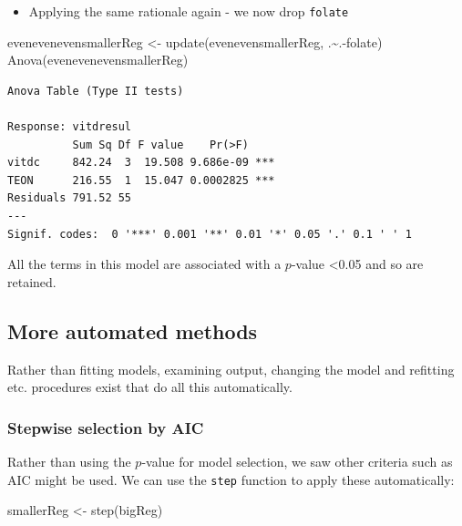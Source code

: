 \documentclass[
  oneside]{krantz}
\newenvironment{Shaded}{\begin{snugshade}}{\end{snugshade}}
\newcommand{\FunctionTok}[1]{\textcolor[rgb]{0.00,0.00,0.00}{#1}}
\newcommand{\NormalTok}[1]{#1}
\newcommand{\OtherTok}[1]{\textcolor[rgb]{0.56,0.35,0.01}{#1}}
\newcommand{\SpecialCharTok}[1]{\textcolor[rgb]{0.00,0.00,0.00}{#1}}
\providecommand{\tightlist}{%
  \setlength{\itemsep}{0pt}\setlength{\parskip}{0pt}}
\begin{document}
\begin{itemize}
\tightlist
\item
  Applying the same rationale again - we now drop \texttt{folate}
\end{itemize}

\begin{Shaded}
\begin{Highlighting}[]
\NormalTok{evenevenevensmallerReg }\OtherTok{\textless{}{-}} \FunctionTok{update}\NormalTok{(evenevensmallerReg, .}\SpecialCharTok{\textasciitilde{}}\NormalTok{.}\SpecialCharTok{{-}}\NormalTok{folate)}
\FunctionTok{Anova}\NormalTok{(evenevenevensmallerReg)}
\end{Highlighting}
\end{Shaded}

\begin{verbatim}
Anova Table (Type II tests)

Response: vitdresul
          Sum Sq Df F value    Pr(>F)    
vitdc     842.24  3  19.508 9.686e-09 ***
TEON      216.55  1  15.047 0.0002825 ***
Residuals 791.52 55                      
---
Signif. codes:  0 '***' 0.001 '**' 0.01 '*' 0.05 '.' 0.1 ' ' 1
\end{verbatim}

All the terms in this model are associated with a \(p\)-value \textless0.05 and so are retained.

\hypertarget{more-automated-methods}{%
\subsection{More automated methods}\label{more-automated-methods}}

Rather than fitting models, examining output, changing the model and refitting etc. procedures exist that do all this automatically.

\hypertarget{stepwise-selection-by-aic}{%
\subsubsection{Stepwise selection by AIC}\label{stepwise-selection-by-aic}}

Rather than using the \(p\)-value for model selection, we saw other criteria such as AIC might be used. We can use the \texttt{step} function to apply these automatically:

\begin{Shaded}
\begin{Highlighting}[]
\NormalTok{smallerReg }\OtherTok{\textless{}{-}} \FunctionTok{step}\NormalTok{(bigReg)}
\end{Highlighting}
\end{Shaded}
\end{document}
